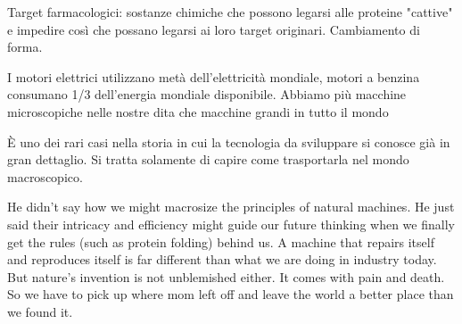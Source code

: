 Target farmacologici: sostanze chimiche che possono legarsi alle proteine "cattive" e impedire così che possano legarsi ai loro target originari.
Cambiamento di forma.

I motori elettrici utilizzano metà dell'elettricità mondiale, motori a benzina consumano 1/3 dell'energia mondiale disponibile.
Abbiamo più macchine microscopiche nelle nostre dita che macchine grandi in tutto il mondo

È uno dei rari casi nella storia in cui la tecnologia da sviluppare si conosce già in gran dettaglio. Si tratta solamente di capire come trasportarla nel mondo macroscopico.

He didn't say how we might macrosize the principles of natural machines. He just said their intricacy and efficiency might guide our future thinking when we finally get the rules (such as protein folding) behind us. A machine that repairs itself and reproduces itself is far different than what we are doing in industry today. But nature's invention is not unblemished either. It comes with pain and death. So we have to pick up where mom left off and leave the world a better place than we found it.
